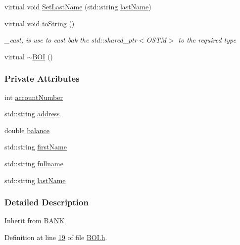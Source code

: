 \begin{DoxyCompactItemize}
\item 
virtual void \hyperlink{class_b_o_i_a663906e9a59ffa970fb928746c01e8af_a663906e9a59ffa970fb928746c01e8af}{Set\+Last\+Name} (std\+::string \hyperlink{class_b_o_i_ad51bfa6f28816c7f5036447ff809cecf_ad51bfa6f28816c7f5036447ff809cecf}{last\+Name})
\item 
virtual void \hyperlink{class_b_o_i_ab02a4dd4ebcc5b2abfaca19f2dff2006_ab02a4dd4ebcc5b2abfaca19f2dff2006}{to\+String} ()
\begin{DoxyCompactList}\small\item\em \+\_\+cast, is use to cast bak the std\+::shared\+\_\+ptr$<$\+O\+S\+T\+M$>$ to the required type \end{DoxyCompactList}\item 
virtual \hyperlink{class_b_o_i_a617f46a599129178c6b11b4846759a6c_a617f46a599129178c6b11b4846759a6c}{$\sim$\+B\+OI} ()
\end{DoxyCompactItemize}
\subsubsection*{Private Attributes}
\begin{DoxyCompactItemize}
\item 
int \hyperlink{class_b_o_i_a35c9fd6e938eb44ad4e076bc6a736851_a35c9fd6e938eb44ad4e076bc6a736851}{account\+Number}
\item 
std\+::string \hyperlink{class_b_o_i_ab9315fe76fd9f07551f5ae7899d33516_ab9315fe76fd9f07551f5ae7899d33516}{address}
\item 
double \hyperlink{class_b_o_i_aa00a3d8baf3420647c40119b7fa4ed6f_aa00a3d8baf3420647c40119b7fa4ed6f}{balance}
\item 
std\+::string \hyperlink{class_b_o_i_a12872fd8c15dbf833f78862b00579ed1_a12872fd8c15dbf833f78862b00579ed1}{first\+Name}
\item 
std\+::string \hyperlink{class_b_o_i_a6d7c892a54bb6f7327cdc777081ab5f4_a6d7c892a54bb6f7327cdc777081ab5f4}{fullname}
\item 
std\+::string \hyperlink{class_b_o_i_ad51bfa6f28816c7f5036447ff809cecf_ad51bfa6f28816c7f5036447ff809cecf}{last\+Name}
\end{DoxyCompactItemize}


\subsubsection{Detailed Description}
Inherit from \hyperlink{class_b_a_n_k}{B\+A\+NK} 

Definition at line \hyperlink{_b_o_i_8h_source_l00019}{19} of file \hyperlink{_b_o_i_8h_source}{B\+O\+I.\+h}.



